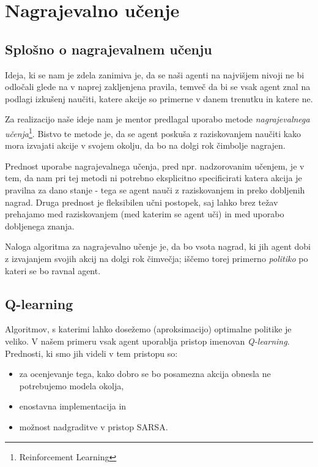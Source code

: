 \documentclass[a4paper,10pt]{article}
\begin{document}
\section{Nagrajevalno učenje} \label{sec:nagrajevalno-ucenje}
\subsection{Splošno o nagrajevalnem učenju}

Ideja, ki se nam je zdela zanimiva je, da se naši agenti na najvišjem nivoji ne bi odločali glede na v naprej zakljenjena pravila, temveč da bi se vsak agent znal na podlagi izkušenj naučiti, katere akcije so primerne v danem trenutku in katere ne. 

Za realizacijo naše ideje nam je mentor predlagal uporabo metode \textit{nagrajevalnega učenja}\footnote{Reinforcement Learning}. Bistvo te metode je, da se agent poskuša z raziskovanjem naučiti kako mora izvajati akcije v svojem okolju, da bo na dolgi rok čimbolje nagrajen.

Prednost uporabe nagrajevalnega učenja, pred npr. nadzorovanim učenjem, je v tem, da nam pri tej metodi ni potrebno eksplicitno specificirati katera akcija je pravilna za dano stanje - tega se agent nauči z raziskovanjem in preko dobljenih nagrad. Druga prednost je fleksibilen učni postopek, saj lahko brez težav prehajamo med raziskovanjem (med katerim se agent uči) in med uporabo dobljenega znanja.

Naloga algoritma za nagrajevalno učenje je, da bo vsota nagrad, ki jih agent dobi z izvajanjem svojih akcij na dolgi rok čimvečja; iščemo torej primerno \textit{politiko} po kateri se bo ravnal agent. 

\subsection{Q-learning}

Algoritmov, s katerimi lahko dosežemo (aproksimacijo) optimalne politike je veliko. V našem primeru vsak agent uporablja pristop imenovan \textit{Q-learning}\cite{rl}. Prednosti, ki smo jih videli v tem pristopu so:

\begin{itemize}
 \item za ocenjevanje tega, kako dobro se bo posamezna akcija obnesla ne potrebujemo modela okolja,
 \item enostavna implementacija in
 \item možnost nadgraditve v pristop SARSA.
\end{itemize}
\end{document}
